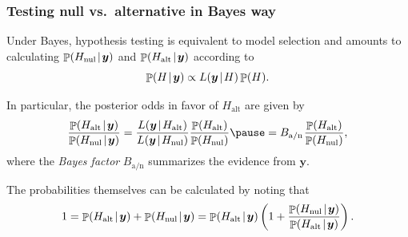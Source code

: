 \documentclass[18pt, handout]{beamer}
\newcommand{\defineTightSpacing}{%
	\setlength{\abovedisplayskip}{.25\baselineskip}%
	\setlength{\belowdisplayskip}{.25\baselineskip}%
}
\newcommand{\given}{\mskip.7\thinmuskip | \mskip.7\thinmuskip}
\newcommand{\thinnerspace}{\mskip.5\thinmuskip}
\DeclareMathOperator{\probability}{\mathbb{P}}
\newcommand{\likelihood}{L}
\newcommand{\by}{\bm{y}}
\newcommand{\hypothesis}{H}
\newcommand{\nullSub}{\mathrm{nul}}
\newcommand{\altSub}{\mathrm{alt}}
\newcommand{\bayesFacAlt}{B_{\mathrm{a} / \mathrm{n}}}
\begin{document}
\begin{frame}
\frametitle{Testing null vs.\ alternative in Bayes way}
Under Bayes, hypothesis testing is equivalent to model selection and amounts to calculating $\probability(\hypothesis_\nullSub \given \by)$ and $\probability(\hypothesis_\altSub \given \by)$ according to
\begin{equation*} \defineTightSpacing%
\probability(\hypothesis \given \by)
	\propto \likelihood(\by \given \hypothesis) \probability(\hypothesis).
\end{equation*}

In particular, the posterior odds in favor of $\hypothesis_\altSub$ are given by
\begin{equation*} \defineTightSpacing%
\frac{%
	\probability(\hypothesis_\altSub \given \by)%
}{%
	\probability(\hypothesis_\nullSub \given \by)
}%
	= \frac{%
		\likelihood(\by \given \hypothesis_\altSub)%
	}{%
		\likelihood(\by \given \hypothesis_\nullSub) 
	}%
	\frac{%
		\probability(\hypothesis_\altSub)%
	}{%
		\probability(\hypothesis_\nullSub) 
	}
	\pause
	= \bayesFacAlt \thinnerspace
	\frac{%
		\probability(\hypothesis_\altSub)%
	}{%
		\probability(\hypothesis_\nullSub) 
	},
\end{equation*}
where the \textit{Bayes factor} $\bayesFacAlt$ summarizes the evidence from $\by$.

\smallskip
The probabilities themselves can be calculated by noting that 
\begin{equation*} \defineTightSpacing%
1 
	= \probability(\hypothesis_\altSub \given \by) + \probability(\hypothesis_\nullSub \given \by)
	= \probability(\hypothesis_\altSub \given \by) \left(
		1 + \frac{%
			\probability(\hypothesis_\nullSub \given \by)%
		}{%
			\probability(\hypothesis_\altSub \given \by) 
		}
	\right).
\end{equation*}
\end{frame}
\end{document}
